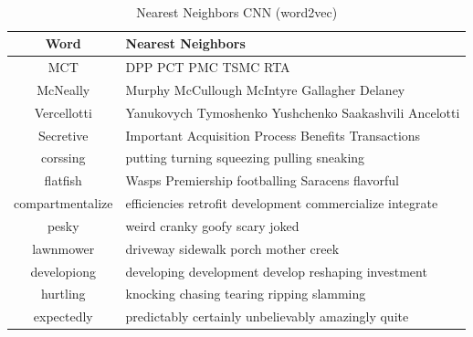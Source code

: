         \begin{table}[!h]
          \begin{center}
            \caption{Nearest Neighbors CNN (word2vec)}
            ~\\
            \small
            \label{tab:nearest:cnn-word2vec}
            \begin{tabular}{c|l}
              \textbf{Word} & \textbf{Nearest Neighbors}\\
              \hline
              MCT & DPP PCT PMC TSMC RTA\\
              McNeally & Murphy McCullough McIntyre Gallagher Delaney\\
              Vercellotti & Yanukovych Tymoshenko Yushchenko Saakashvili Ancelotti\\
              Secretive & Important Acquisition Process Benefits Transactions\\
              corssing & putting turning squeezing pulling sneaking\\
              flatfish & Wasps Premiership footballing Saracens flavorful\\
              compartmentalize & efficiencies retrofit development commercialize integrate\\
              pesky & weird cranky goofy scary joked\\
              lawnmower & driveway sidewalk porch mother creek\\
              developiong & developing development develop reshaping investment\\
              hurtling & knocking chasing tearing ripping slamming\\
              expectedly & predictably certainly unbelievably amazingly quite\\
            \end{tabular}
          \end{center}
        \end{table}

        
        
